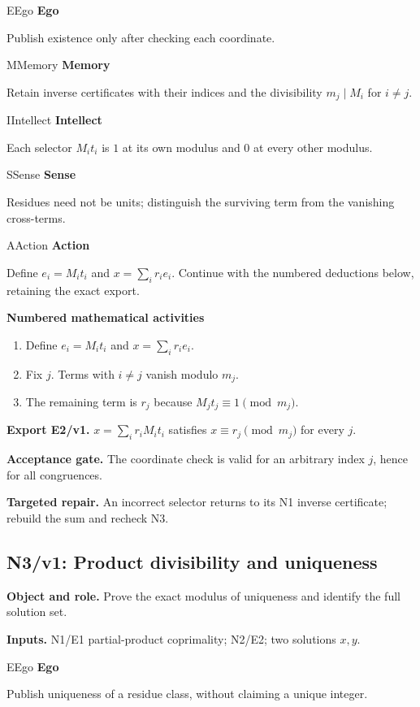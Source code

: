 \documentclass[preprint,12pt,aps,pra,showkeys,amsmath,amssymb,superscriptaddress,floatfix]{revtex4-2}
\theoremstyle{definition}
\theoremstyle{remark}
\newcommand{\mmfaculty}[3]{%
 \begin{mmfacultybox}{#1}{#2}
 {\sffamily\bfseries\color{MMBlue}#2}\par\smallskip #3
 \end{mmfacultybox}}
\newcommand{\field}[2]{\par\smallskip\noindent\textbf{#1.} #2\par}
\begin{document}
\mmfaculty{E}{Ego}{Publish existence only after checking each coordinate.}

\mmfaculty{M}{Memory}{Retain inverse certificates with their indices and the divisibility
\(m_j\mid M_i\) for \(i\ne j\).}

\mmfaculty{I}{Intellect}{Each selector \(M_it_i\) is \(1\) at its own modulus and \(0\) at every
other modulus.}

\mmfaculty{S}{Sense}{Residues need not be units; distinguish the surviving term from the
vanishing cross-terms.}

\mmfaculty{A}{Action}{Define \(e_i=M_it_i\) and \(x=\sum_i r_ie_i\). Continue with the
numbered deductions below, retaining the exact export.}

\smallskip\noindent\textbf{Numbered mathematical activities}

\begin{enumerate}[label=N2.\arabic*,leftmargin=3.4em]

\item Define \(e_i=M_it_i\) and \(x=\sum_i r_ie_i\).

\item Fix \(j\). Terms with \(i\ne j\) vanish modulo \(m_j\).

\item The remaining term is \(r_j\) because \(M_jt_j\equiv1\pmod{m_j}\).

\end{enumerate}

\field{Export E2/v1}{\(x=\sum_i r_iM_it_i\) satisfies \(x\equiv r_j\pmod{m_j}\) for every
\(j\).}

\field{Acceptance gate}{The coordinate check is valid for an arbitrary index \(j\), hence for
all congruences.}

\field{Targeted repair}{An incorrect selector returns to its N1 inverse certificate; rebuild the
sum and recheck N3.}

\clearpage

\subsection{N3/v1: Product divisibility and uniqueness}

\field{Object and role}{Prove the exact modulus of uniqueness and identify the full solution
set.}

\field{Inputs}{N1/E1 partial-product coprimality; N2/E2; two solutions \(x,y\).}

\mmfaculty{E}{Ego}{Publish uniqueness of a residue class, without claiming a unique
integer.}
\end{document}
